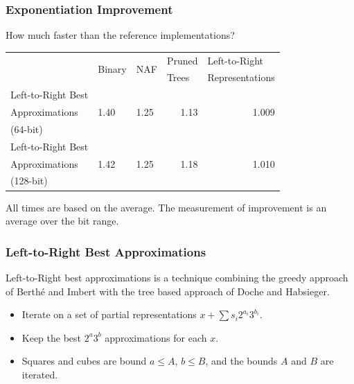\documentclass{beamer}
\newcommand{\smallfont}{\fontsize{6pt}{7.2}\selectfont}
\begin{document}
\begin{frame}
\frametitle{Exponentiation Improvement}
How much faster than the reference implementations?
\begin{table}
\centering
\begin{tabular}{ | l | l | l | l | l | }
\hline
& \multirow{2}{*}{Binary} & \multirow{2}{*}{NAF} & Pruned & Left-to-Right \\
& & & Trees & Representations \\
\hline
Left-to-Right Best & \multirow{3}{*}{1.40} & \multirow{3}{*}{1.25} & \multicolumn{1}{|r|}{\multirow{3}{*}{1.13}} & \multicolumn{1}{|r|}{\multirow{3}{*}{1.009}} \\
Approximations & & & &\\
(64-bit) & & & &\\

\hline

Left-to-Right Best & \multirow{3}{*}{1.42} & \multirow{3}{*}{1.25} & \multicolumn{1}{|r|}{\multirow{3}{*}{1.18}} & \multicolumn{1}{|r|}{\multirow{3}{*}{1.010}} \\
Approximations & & & &\\
(128-bit) & & & &\\

\hline
\end{tabular}
\end{table}

\bigskip
\smallfont
All times are based on the average.  The measurement of improvement is an average over the bit range.
\end{frame}


\begin{frame}
\frametitle{Left-to-Right Best Approximations}
Left-to-Right best approximations is a technique combining the greedy approach of Berth{\'e} and Imbert with the tree based approach of Doche and Habsieger.
\begin{itemize}
\item Iterate on a set of partial representations $x + \sum s_i2^{a_i}3^{b_i}$.
\item Keep the best $2^a 3^b$ approximations for each $x$.
\item Squares and cubes are bound $a \le A$, $b \le B$, and the bounds $A$ and $B$ are iterated.
\end{itemize}
\end{frame}
\end{document}
